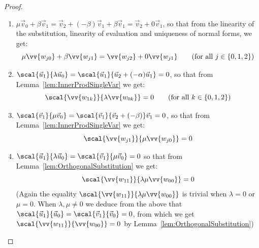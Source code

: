 \begin{lemma}
\begin{proof}
\begin{enumerate}
        \item\label{A9:it2} $\mu\vec{v}_{0} + \beta\vec{v}_{1}=\vec{v}_{2} + (-\beta) \vec{v}_{1} + \beta \vec{v}_{1} = \vec{v}_{2} + 0 \vec{v}_{1}$, so that from the linearity of the substitution, linearity of evaluation and uniqueness of normal forms, we get:
        \[
        \mu\vv{w_{j0}} + \beta \vv{w_{j1}} = \vv{w_{j2}} + 0 \vv{w_{j1}} \qquad(\text{for all }j\in\{0,1,2\})
        \]
        
        \item\label{A9:it3} $\scal{\vec{u}_{1}}{\lambda\vec{u}_{0}}=\scal{\vec{u}_{1}}{\vec{u}_{2}+(- \alpha)\vec{u}_{1}}=0$, so that from Lemma~\ref{lem:InnerProdSingleVar} we get:
        \[
        \scal{\vv{w_{1k}}}{\lambda\vv{w_{0k}}}= 0 \qquad(\text{for all }k\in\{0,1,2\})
        \]
        
        \item\label{A9:it4} $\scal{\vec{v}_{1}}{\mu\vec{v}_{0}}=\scal{\vec{v}_{1}}{\vec{v}_{2} + (-\beta)}\vec{v}_{1}=0$, so that from Lemma~\ref{lem:InnerProdSingleVar} we get:
        \[
        \scal{\vv{w_{j1}}}{\mu\vv{w_{j0}}}=0
        \]
                
        \item\label{A9:it5} $\scal{\vec{u}_{1}}{\lambda\vec{u}_{0}}=\scal{\vec{v}_{1}}{\mu\vec{v}_{0}}=0$ so that from Lemma~\ref{lem:OrthogonalSubstitution} we get:
        \[
        \scal{\vv{w_{11}}}{\lambda\mu\vv{w_{00}}}=0
        \]
        (Again the equality $\scal{\vv{w_{11}}}{\lambda\mu\vv{w_{00}}}$ is trivial when $\lambda=0$ or $\mu=0$. When $\lambda ,\mu\neq 0$ we deduce from the above that $\scal{\vec{u}_{1}}{\vec{u}_{0}}=\scal{\vec{v}_{1}}{\vec{v}_{0}}=0$, from which we get $\scal{\vv{w_{11}}}{\vv{w_{00}}}=0$ by Lemma~\ref{lem:OrthogonalSubstitution})
    \end{enumerate}


\end{proof}
\end{lemma}
